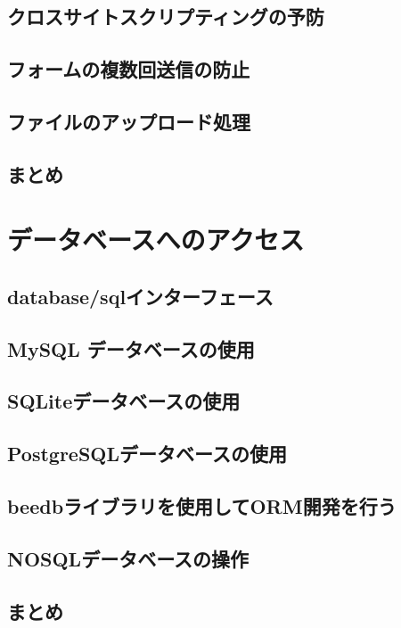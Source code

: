 \subsection{クロスサイトスクリプティングの予防}

\subsection{フォームの複数回送信の防止}

\subsection{ファイルのアップロード処理}

\subsection{まとめ}


\section{データベースへのアクセス}

\subsection{database/sqlインターフェース}

\subsection{MySQL データベースの使用}

\subsection{SQLiteデータベースの使用}

\subsection{PostgreSQLデータベースの使用}

\subsection{beedbライブラリを使用してORM開発を行う}

\subsection{NOSQLデータベースの操作}

\subsection{まとめ}



